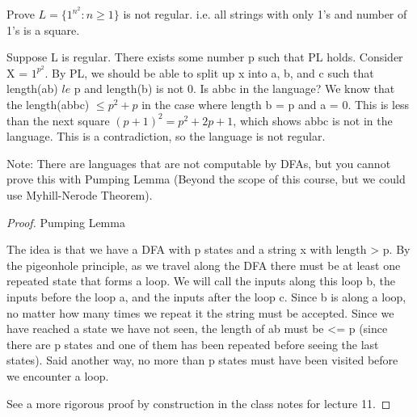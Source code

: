 \begin{example}
    
    Prove $L = \{ 1^{n^2}: n \ge 1\}$ is not regular. i.e. all strings with only 1's and number of 1's is a square.

    Suppose L is regular. There exists some number p such that PL holds. Consider X = $1^{p^2}$.  By PL, we should be able to split up x into a, b, and c such that length(ab) $le$ p and length(b) is not 0. 
    Is abbc in the language? We know that the length(abbc) $\le p^2 + p$ in the case where length b = p and a = 0. This is less than the next square $(p + 1)^2 = p^2 + 2p + 1$, which shows abbc is not in the language. This is a contradiction, so the language is not regular. 
\end{example}

Note: There are languages that are not computable by DFAs, but you cannot prove this with Pumping Lemma (Beyond the scope of this course, but we could use Myhill-Nerode Theorem).

\vspace{2cm}

\begin{proof}
    Pumping Lemma

    The idea is that we have a DFA with p states and a string x with length > p. By the pigeonhole principle, as we travel along the DFA there must be at least one repeated state that forms a loop. We will call the inputs along this loop b, the inputs before the loop a, and the inputs after the loop c. Since b is along a loop, no matter how many times we repeat it the string must be accepted. Since we have reached a state we have not seen, the length of ab must be <= p (since there are p states and one of them has been repeated before seeing the last states). Said another way, no more than p states must have been visited before we encounter a loop.

    See a more rigorous proof by construction in the class notes for lecture 11.
\end{proof}